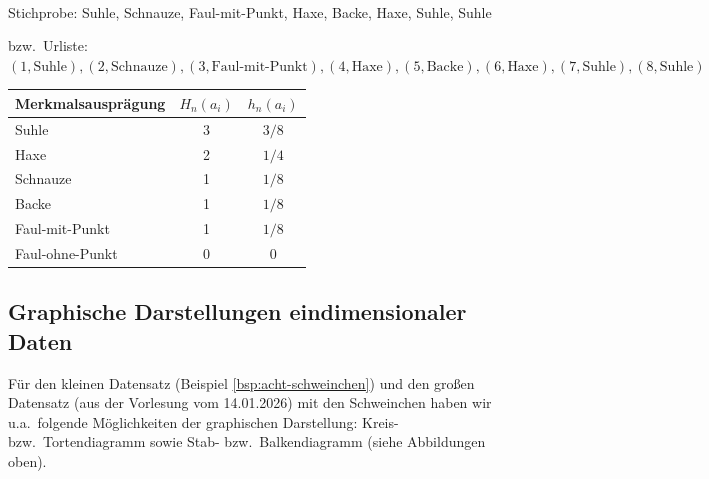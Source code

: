 \begin{bsp}
    \label{bsp:acht-schweinchen}   \\
    Stichprobe: Suhle, Schnauze, Faul-mit-Punkt, Haxe, Backe, Haxe, Suhle, Suhle

    bzw.\ Urliste: $(1,\text{Suhle}),(2,\text{Schnauze}),(3,\text{Faul-mit-Punkt}),(4,\text{Haxe}),(5,\text{Backe}),(6,\text{Haxe}),(7,\text{Suhle}),(8,\text{Suhle})$

    \begin{mytable}
        \begin{tabular}{lcc}
            \hline
            \textbf{Merkmalsausprägung} & $H_n(a_i)$ & $h_n(a_i)$ \\
            \hline
            Suhle                       & 3          & $3/8$      \\
            Haxe                        & 2          & $1/4$      \\
            Schnauze                    & 1          & $1/8$      \\
            Backe                       & 1          & $1/8$      \\
            Faul-mit-Punkt              & 1          & $1/8$      \\
            Faul-ohne-Punkt             & 0          & $0$        \\
            \hline
        \end{tabular}
    \end{mytable}
\end{bsp}



\subsection{Graphische Darstellungen eindimensionaler Daten}\label{subsec:graphische-darstellungen-eindimensionaler-daten}


Für den kleinen Datensatz (Beispiel \autoref{bsp:acht-schweinchen}) und den großen Datensatz (aus der Vorlesung vom 14.01.2026) mit den
Schweinchen haben wir u.a.\ folgende Möglichkeiten der graphischen Darstellung: Kreis- bzw.\ Tortendiagramm sowie Stab- bzw.\ Balkendiagramm (siehe Abbildungen oben).

